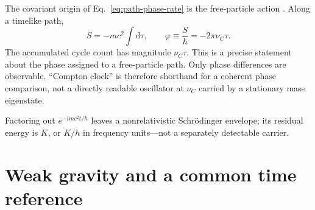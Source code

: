 \documentclass[12pt]{article}
\begin{document}
The covariant origin of Eq.~\eqref{eq:path-phase-rate} is the free-particle action \cite{Landau}. Along a timelike path,
\begin{equation}
  S=-mc^2\int\mathrm{d}\tau,
  \qquad
  \varphi\equiv\frac{S}{\hbar}=-2\pi\nu_C\tau.
  \label{eq:proper-time-phase}
\end{equation}
The accumulated cycle count has magnitude $\nu_C\tau$. This is a precise statement about the phase assigned to a free-particle path. Only phase differences are observable. ``Compton clock'' is therefore shorthand for a coherent phase comparison, not a directly readable oscillator at $\nu_C$ carried by a stationary mass eigenstate.

Factoring out $e^{-imc^2t/\hbar}$ leaves a nonrelativistic Schr\"odinger envelope; its residual energy is $K$, or $K/h$ in frequency units---not a separately detectable carrier.

\section{Weak gravity and a common time reference}
\end{document}
